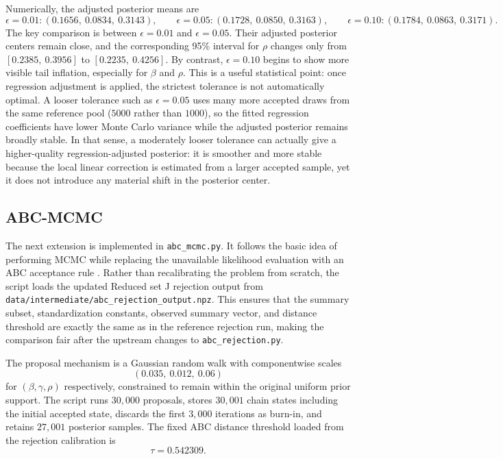 \documentclass[11pt]{article}
\begin{document}
Numerically, the adjusted posterior means are
\[
\epsilon=0.01: (0.1656,\ 0.0834,\ 0.3143), \qquad
\epsilon=0.05: (0.1728,\ 0.0850,\ 0.3163), \qquad
\epsilon=0.10: (0.1784,\ 0.0863,\ 0.3171).
\]
The key comparison is between $\epsilon=0.01$ and $\epsilon=0.05$. Their adjusted posterior centers remain close, and the corresponding 95\% interval for $\rho$ changes only from $[0.2385,\ 0.3956]$ to $[0.2235,\ 0.4256]$. By contrast, $\epsilon=0.10$ begins to show more visible tail inflation, especially for $\beta$ and $\rho$. This is a useful statistical point: once regression adjustment is applied, the strictest tolerance is not automatically optimal. A looser tolerance such as $\epsilon=0.05$ uses many more accepted draws from the same reference pool ($5000$ rather than $1000$), so the fitted regression coefficients have lower Monte Carlo variance while the adjusted posterior remains broadly stable. In that sense, a moderately looser tolerance can actually give a higher-quality regression-adjusted posterior: it is smoother and more stable because the local linear correction is estimated from a larger accepted sample, yet it does not introduce any material shift in the posterior center.

\subsection{ABC-MCMC}

The next extension is implemented in \texttt{abc\_mcmc.py}. It follows the basic idea of performing MCMC while replacing the unavailable likelihood evaluation with an ABC acceptance rule \citep{marjoram2003}. Rather than recalibrating the problem from scratch, the script loads the updated Reduced set J rejection output from \texttt{data/intermediate/abc\_rejection\_output.npz}. This ensures that the summary subset, standardization constants, observed summary vector, and distance threshold are exactly the same as in the reference rejection run, making the comparison fair after the upstream changes to \texttt{abc\_rejection.py}.

The proposal mechanism is a Gaussian random walk with componentwise scales
\[
(0.035,\ 0.012,\ 0.06)
\]
for $(\beta,\gamma,\rho)$ respectively, constrained to remain within the original uniform prior support. The script runs $30{,}000$ proposals, stores $30{,}001$ chain states including the initial accepted state, discards the first $3{,}000$ iterations as burn-in, and retains $27{,}001$ posterior samples. The fixed ABC distance threshold loaded from the rejection calibration is
\[
\tau = 0.542309.
\]
\end{document}
